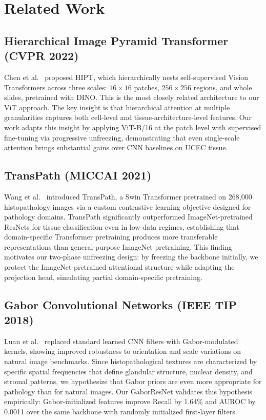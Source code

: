 \documentclass[conference]{IEEEtran}
\begin{document}
\section{Related Work}

\subsection{Hierarchical Image Pyramid Transformer (CVPR 2022)}
Chen et al.~\cite{b1} proposed HIPT, which hierarchically nests self-supervised Vision Transformers across three scales: $16\times16$ patches, $256\times256$ regions, and whole slides, pretrained with DINO. This is the most closely related architecture to our ViT approach. The key insight is that hierarchical attention at multiple granularities captures both cell-level and tissue-architecture-level features. Our work adapts this insight by applying ViT-B/16 at the patch level with supervised fine-tuning via progressive unfreezing, demonstrating that even single-scale attention brings substantial gains over CNN baselines on UCEC tissue.

\subsection{TransPath (MICCAI 2021)}
Wang et al.~\cite{b2} introduced TransPath, a Swin Transformer pretrained on 268,000 histopathology images via a custom contrastive learning objective designed for pathology domains. TransPath significantly outperformed ImageNet-pretrained ResNets for tissue classification even in low-data regimes, establishing that domain-specific Transformer pretraining produces more transferable representations than general-purpose ImageNet pretraining. This finding motivates our two-phase unfreezing design: by freezing the backbone initially, we protect the ImageNet-pretrained attentional structure while adapting the projection head, simulating partial domain-specific pretraining.

\subsection{Gabor Convolutional Networks (IEEE TIP 2018)}
Luan et al.~\cite{b3} replaced standard learned CNN filters with Gabor-modulated kernels, showing improved robustness to orientation and scale variations on natural image benchmarks. Since histopathological textures are characterized by specific spatial frequencies that define glandular structure, nuclear density, and stromal patterns, we hypothesize that Gabor priors are even more appropriate for pathology than for natural images. Our GaborResNet validates this hypothesis empirically: Gabor-initialized features improve Recall by 1.64\% and AUROC by 0.0011 over the same backbone with randomly initialized first-layer filters.
\end{document}
